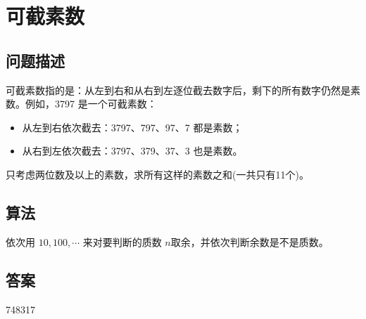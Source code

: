 \section{可截素数}\label{sec:problem37}
\subsection{问题描述}
\begin{tcolorbox}

可截素数指的是：从左到右和从右到左逐位截去数字后，剩下的所有数字仍然是素数。例如，3797 是一个可截素数：

\begin{itemize}
    \item 从左到右依次截去：3797、797、97、7 都是素数；
    \item 从右到左依次截去：3797、379、37、3 也是素数。
\end{itemize}

只考虑两位数及以上的素数，求所有这样的素数之和(一共只有11个)。

\end{tcolorbox}

\subsection{算法}

依次用 \( 10, 100, \cdots \) 来对要判断的质数 \( n \)取余，并依次判断余数是不是质数。

\subsection{答案}
748317
